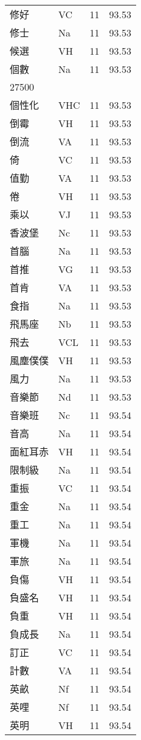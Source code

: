 \documentclass[twocolumn]{book}
\begin{document}
\begin{supertabular}{llrr}
修好 & VC & 11 &  93.53\\
修士 & Na & 11 &  93.53\\
候選 & VH & 11 &  93.53\\
個數 & Na & 11 &  93.53\\
27500\\
個性化 & VHC & 11 &  93.53\\
倒霉 & VH & 11 &  93.53\\
倒流 & VA & 11 &  93.53\\
倚 & VC & 11 &  93.53\\
值勤 & VA & 11 &  93.53\\
倦 & VH & 11 &  93.53\\
乘以 & VJ & 11 &  93.53\\
香波堡 & Nc & 11 &  93.53\\
首腦 & Na & 11 &  93.53\\
首推 & VG & 11 &  93.53\\
首肯 & VA & 11 &  93.53\\
食指 & Na & 11 &  93.53\\
飛馬座 & Nb & 11 &  93.53\\
飛去 & VCL & 11 &  93.53\\
風塵僕僕 & VH & 11 &  93.53\\
風力 & Na & 11 &  93.53\\
音樂節 & Nd & 11 &  93.53\\
音樂班 & Nc & 11 &  93.54\\
音高 & Na & 11 &  93.54\\
面紅耳赤 & VH & 11 &  93.54\\
限制級 & Na & 11 &  93.54\\
重振 & VC & 11 &  93.54\\
重金 & Na & 11 &  93.54\\
重工 & Na & 11 &  93.54\\
軍機 & Na & 11 &  93.54\\
軍旅 & Na & 11 &  93.54\\
負傷 & VH & 11 &  93.54\\
負盛名 & VH & 11 &  93.54\\
負重 & VH & 11 &  93.54\\
負成長 & Na & 11 &  93.54\\
訂正 & VC & 11 &  93.54\\
計數 & VA & 11 &  93.54\\
英畝 & Nf & 11 &  93.54\\
英哩 & Nf & 11 &  93.54\\
英明 & VH & 11 &  93.54\\

\end{supertabular}
\end{document}
